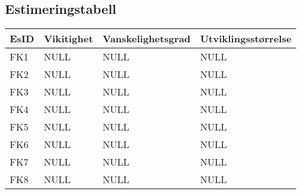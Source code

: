 \documentclass[12pt]{article}
\begin{document}
    \subsection{Estimeringstabell}
        \begin{tabular}{|p{2cm}|p{4cm}|p{4cm}|p{4cm}| } 
            \hline
            \bf EsID & \bf Vikitighet & \bf Vanskelighetsgrad & \bf Utviklingsstørrelse\\
            \hline
            FK1 & NULL & NULL & NULL\\
            \hline
            FK2 & NULL & NULL & NULL\\
            \hline
            FK3 & NULL & NULL & NULL\\
            \hline
            FK4 & NULL & NULL & NULL\\
            \hline
            FK5 & NULL & NULL & NULL\\
            \hline
            FK6 & NULL & NULL & NULL\\
            \hline
            FK7 & NULL & NULL & NULL\\
            \hline
            FK8 & NULL & NULL & NULL\\
            \hline
        \end{tabular}
\end{document}
